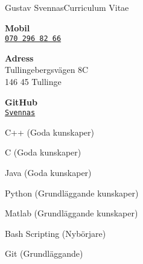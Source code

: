 \documentclass{article}
\begin{document}
\begin{cv}{Gustav Svennas}{Curriculum Vitae}
\cvseparator[3]
\begin{cvitem}[Phone][4]
    \textbf{Mobil}\\
    \href{tel:+46702968266}{\texttt{070 296 82 66}}
\end{cvitem}

\cvseparator[3]
\begin{cvitem}[Home][4]
    \textbf{Adress}\\
    Tullingebergsvägen 8C\\ 146 45 Tullinge
\end{cvitem}

\cvseparator[3]
\begin{cvitem}[Globe][4]
    \textbf{GitHub}\\
    \href{https://github.com/Svennas}{\texttt{Svennas}}
\end{cvitem}




\begin{cvitem}
    C++ (Goda kunskaper)
\end{cvitem}

\begin{cvitem}
    C (Goda kunskaper)
\end{cvitem}

\begin{cvitem}
    Java (Goda kunskaper)
\end{cvitem}

\begin{cvitem}
    Python (Grundläggande kunskaper)
\end{cvitem}

\cvseparator
\begin{cvitem}
    Matlab (Grundläggande kunskaper)
\end{cvitem}

\cvseparator
\begin{cvitem}
    Bash Scripting (Nybörjare)
\end{cvitem}


\cvseparator
\begin{cvitem}
    Git (Grundläggande)
\end{cvitem}




\end{cv}
\end{document}
